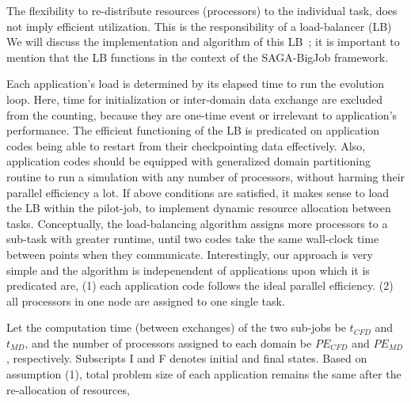 \documentclass[conference,final]{IEEEtran}
\begin{document}


The flexibility to re-distribute resources (processors) to the
individual task, does not imply efficient utilization. This is the
responsibility of a load-balancer (LB) We will discuss the
implementation and algorithm of this LB~\cite{Ko}; it is important to mention
that the LB functions in the context of the SAGA-BigJob framework.

Each application's load is determined by its elapsed time to run the
evolution loop. Here, time for initialization or inter-domain data
exchange are excluded from the counting, because they are one-time
event or irrelevant to application's performance.  The efficient
functioning of the LB is predicated on application codes being able to
restart from their checkpointing data effectively.  Also, application
codes should be equipped with generalized domain partitioning routine
to run a simulation with any number of processors, without harming
their parallel efficiency a lot. If above conditions are satisfied, it
makes sense to load the LB within the pilot-job, to implement dynamic
resource allocation between tasks.  Conceptually, the load-balancing
algorithm assigns more processors to a sub-task with greater runtime,
until two codes take the same wall-clock time between points when they
communicate. Interestingly, our approach is very simple and the
algorithm is indepenendent of applications upon which it is predicated
are, (1) each application code follows the ideal parallel efficiency.
(2) all processors in one node are assigned to one single task.

Let the computation time (between exchanges) of the two sub-jobs be
$t_{CFD}$ and $t_{MD}$, and the number of processors assigned to each
domain be $PE_{CFD}$ and $PE_{MD}$, respectively. Subscripts I and F
denotes initial and final states. Based on assumption (1), total
problem size of each application remains the same after the
re-allocation of resources,
\end{document}
